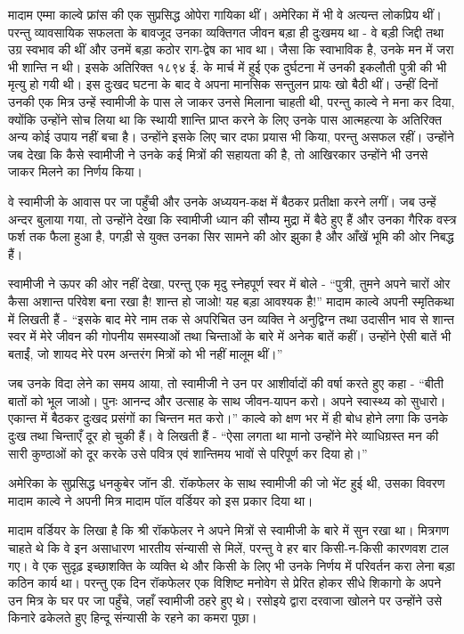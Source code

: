 मादाम एम्मा काल्वे फ्रांस की एक सुप्रसिद्ध ओपेरा गायिका थीं। अमेरिका में भी वे अत्यन्त लोकप्रिय थीं। परन्तु व्यावसायिक सफलता के बावजूद उनका व्यक्तिगत जीवन बड़ा ही दुःखमय था - वे बड़ी जिद्दी तथा उग्र स्वभाव की थीं और उनमें बड़ा कठोर राग-द्वेष का भाव था। जैसा कि स्वाभाविक है, उनके मन में जरा भी शान्ति न थी। इसके अतिरिक्त १८९४ ई. के मार्च में हुई एक दुर्घटना में उनकी इकलौती पुत्री की भी मृत्यु हो गयी थी। इस दुःखद घटना के बाद वे अपना मानसिक सन्तुलन प्रायः खो बैठी थीं। उन्हीं दिनों उनकी एक मित्र उन्हें स्वामीजी के पास ले जाकर उनसे मिलाना चाहती थी, परन्तु काल्वे ने मना कर दिया, क्योंकि उन्होंने सोच लिया था कि स्थायी शान्ति प्राप्त करने के लिए उनके पास आत्महत्या के अतिरिक्त अन्य कोई उपाय नहीं बचा है। उन्होंने इसके लिए चार दफा प्रयास भी किया, परन्तु असफल रहीं। उन्होंने जब देखा कि कैसे स्वामीजी ने उनके कई मित्रों की सहायता की है, तो आखिरकार उन्होंने भी उनसे जाकर मिलने का निर्णय किया। 

वे स्वामीजी के आवास पर जा पहुँची और उनके अध्ययन-कक्ष में बैठकर प्रतीक्षा करने लगीं। जब उन्हें अन्दर बुलाया गया, तो उन्होंने देखा कि स्वामीजी ध्यान की सौम्य मुद्रा में बैठे हुए हैं और उनका गैरिक वस्त्र फर्श तक फैला हुआ है, पगड़ी से युक्त उनका सिर सामने की ओर झुका है और आँखें भूमि की ओर निबद्ध हैं। 

स्वामीजी ने ऊपर की ओर नहीं देखा, परन्तु एक मृदु स्नेहपूर्ण स्वर में बोले - “पुत्री, तुमने अपने चारों ओर कैसा अशान्त परिवेश बना रखा है! शान्त हो जाओ! यह बड़ा आवश्यक है!” मादाम काल्वे अपनी स्मृतिकथा में लिखती हैं - “इसके बाद मेरे नाम तक से अपरिचित उन व्यक्ति ने अनुद्विग्न तथा उदासीन भाव से शान्त स्वर में मेरे जीवन की गोपनीय समस्याओं तथा चिन्ताओं के बारे में अनेक बातें कहीं। उन्होंने ऐसी बातें भी बताईं, जो शायद मेरे परम अन्तरंग मित्रों को भी नहीं मालूम थीं।” 

जब उनके विदा लेने का समय आया, तो स्वामीजी ने उन पर आशीर्वादों की वर्षा करते हुए कहा - “बीती बातों को भूल जाओ। पुनः आनन्द और उत्साह के साथ जीवन-यापन करो। अपने स्वास्थ्य को सुधारो। एकान्त में बैठकर दुःखद प्रसंगों का चिन्तन मत करो।” काल्वे को क्षण भर में ही बोध होने लगा कि उनके दुःख तथा चिन्ताएँ दूर हो चुकी हैं। वे लिखती हैं - “ऐसा लगता था मानो उन्होंने मेरे व्याधिग्रस्त मन की सारी कुण्ठाओं को दूर करके उसे पवित्र एवं शान्तिमय भावों से परिपूर्ण कर दिया हो।” 

\vskip -8pt

\delimiter

अमेरिका के सुप्रसिद्ध धनकुबेर जॉन डी. रॉकफेलर के साथ स्वामीजी की जो भेंट हुई थी, उसका विवरण मादाम काल्वे ने अपनी मित्र मादाम पॉल वर्डियर को इस प्रकार दिया था। 

मादाम वर्डियर के लिखा है कि श्री रॉकफेलर ने अपने मित्रों से स्वामीजी के बारे में सुन रखा था। मित्रगण चाहते थे कि वे इन असाधारण भारतीय संन्यासी से मिलें, परन्तु वे हर बार किसी-न-किसी कारणवश टाल गए। वे एक सुदृढ़ इच्छाशक्ति के व्यक्ति थे और किसी के लिए भी उनके निर्णय में परिवर्तन करा लेना बड़ा कठिन कार्य था। परन्तु एक दिन रॉकफेलर एक विशिष्ट मनोवेग से प्रेरित होकर सीधे शिकागो के अपने उन मित्र के घर पर जा पहुँचे, जहाँ स्वामीजी ठहरे हुए थे। रसोइये द्वारा दरवाजा खोलने पर उन्होंने उसे किनारे ढकेलते हुए हिन्दू संन्यासी के रहने का कमरा पूछा। 

